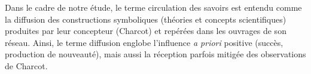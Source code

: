Dans le cadre de notre étude, le terme \og{}circulation des savoirs\fg{} est entendu comme la diffusion des constructions symboliques (théories et concepts scientifiques) produites par leur concepteur (Charcot) et repérées dans les ouvrages de son réseau. Ainsi, le terme \og{}diffusion\fg{} englobe l'influence \textit{a priori} positive (\og{}succès\fg{}, \og{}production de nouveauté\fg{}), mais aussi la réception parfois mitigée des observations de Charcot.

%
